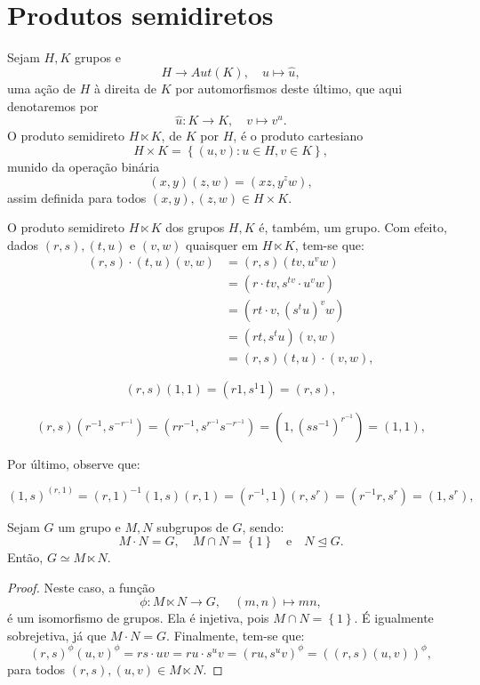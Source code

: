 \section{Produtos semidiretos}\label{sec:produtos-semidiretos}

\begin{definition}
  Sejam $H,K$ grupos e
  \[
    H\to{Aut(K)},\quad{u\mapsto\widehat{u}},
  \]
  uma ação de $H$ à direita de $K$ por automorfismos deste último, que aqui denotaremos por
  \[
    \widehat{u}:K\to{K},\quad{v\mapsto{v^{u}}}.
  \]
  O produto semidireto $H\ltimes{K}$, de $K$ por $H$, é o produto cartesiano
  \[
    H\times{K}
    =
    \left\{
      (u,v)
      :
      u\in{H},v\in{K}
    \right\},
  \]
  munido da operação binária
  \[
    (x,y)(z,w)=(xz,y^{z}w),
  \]
  assim definida para todos $(x,y),(z,w)\in{H\times{K}}$.
\end{definition}

O produto semidireto $H\ltimes{K}$ dos grupos $H,K$ é, também, um grupo. Com efeito, dados $(r,s),(t,u)$ e $(v,w)$ quaisquer em $H\ltimes{K}$, tem-se que:
\begin{align*}
  (r,s)\cdot{(t,u)(v,w)}
  &=(r,s)(tv,u^{v}w)                 \\
  &=(r\cdot{tv},s^{tv}\cdot{u^{v}w}) \\
  &=(rt\cdot{v},(s^{t}u)^{v}w)       \\
  &=(rt,s^{t}u)(v,w)                 \\
  &=(r,s)(t,u)\cdot{(v,w)},
\end{align*}

\[
  (r,s)(1,1)=(r1,s^{1}1)=(r,s),
\]

\[
  (r,s)(r^{-1},s^{-r^{-1}})=(rr^{-1},s^{r^{-1}}s^{-r^{-1}})=(1,(ss^{-1})^{r^{-1}})=(1,1),
\]

Por último, observe que:

\[
  (1,s)^{(r,1)}=(r,1)^{-1}(1,s)(r,1)=(r^{-1},1)(r,s^{r})=(r^{-1}r,s^{r})=(1,s^{r}),
\]

\begin{proposition}
  Sejam $G$ um grupo e $M,N$ subgrupos de $G$, sendo:
  \[
    M\cdot{N}=G,
    \quad
    M\cap{N}=\left\{1\right\}
    \quad\text{e}\quad
    N\unlhd{G}.
  \]
  Então, $G\simeq{M\ltimes{N}}$.
\end{proposition}

\begin{proof}
  Neste caso, a função
  \[
    \phi:M\ltimes{N}\to{G},\quad{(m,n)\mapsto{mn}},
  \]
  é um isomorfismo de grupos. Ela é injetiva, pois $M\cap{N}=\left\{1\right\}$. É igualmente sobrejetiva, já que $M\cdot{N}=G$. Finalmente, tem-se que:
  \[
    (r,s)^{\phi}(u,v)^{\phi}=rs\cdot{uv}=ru\cdot{s^{u}v}=(ru,s^{u}v)^{\phi}=\left((r,s)(u,v)\right)^{\phi},
  \]
  para todos $(r,s),(u,v)\in{M\ltimes{N}}$.
\end{proof}

